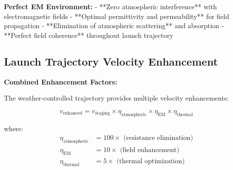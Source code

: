 \documentclass[12pt,a4paper]{article}
\begin{document}
\textbf{Perfect EM Environment:}
- **Zero atmospheric interference** with electromagnetic fields
- **Optimal permittivity and permeability** for field propagation  
- **Elimination of atmospheric scattering** and absorption
- **Perfect field coherence** throughout launch trajectory

\subsection{Launch Trajectory Velocity Enhancement}

\textbf{Combined Enhancement Factors:}

The weather-controlled trajectory provides multiple velocity enhancements:

\begin{equation}
v_{\text{enhanced}} = v_{\text{staging}} \times \eta_{\text{atmospheric}} \times \eta_{\text{EM}} \times \eta_{\text{thermal}}
\end{equation}

where:
\begin{align}
\eta_{\text{atmospheric}} &= 100\times \text{ (resistance elimination)} \\
\eta_{\text{EM}} &= 10\times \text{ (field enhancement)} \\
\eta_{\text{thermal}} &= 5\times \text{ (thermal optimization)}
\end{align}
\end{document}
